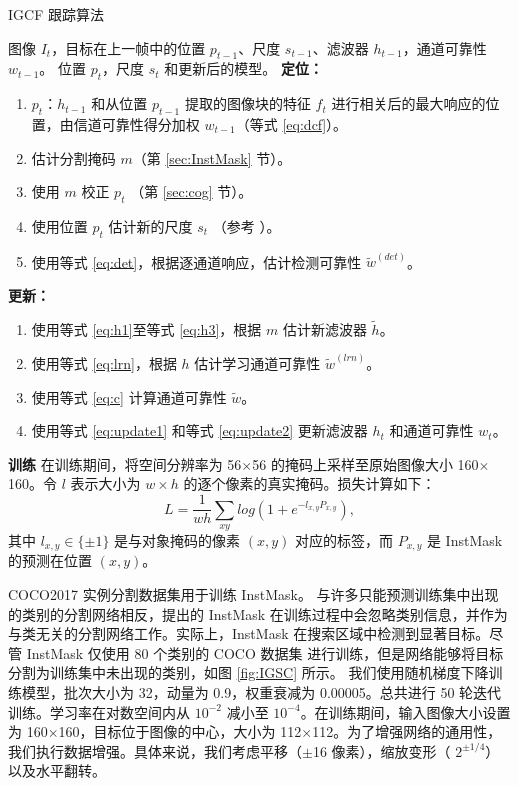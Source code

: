 \begin{algorithm}[t]
  \caption{IGCF 跟踪算法} 
  \begin{algorithmic}
    \Require 图像 $I_t$，目标在上一帧中的位置 $p_{t-1}$、尺度 $s_{t-1}$、滤波器 $h_{t-1}$，通道可靠性 $w_{t-1}$。
    \Ensure 位置 $p_t$，尺度 $s_t$ 和更新后的模型。
  \Statex
  \State \textbf{定位：}
  \begin{enumerate}[leftmargin=0pt,itemindent=1.5em]
    \item $p_t$：$h_{t-1}$ 和从位置 $p_{t-1}$ 提取的图像块的特征 $f_{t}$ 进行相关后的最大响应的位置，由信道可靠性得分加权 $w_{t-1}$（等式 \ref{eq:dcf}）。
    \item 估计分割掩码 $m$（第 \ref{sec:InstMask} 节）。
    \item 使用 $m$ 校正 $p_t$ （第 \ref{sec:cog} 节）。
    \item 使用位置 $p_t$ 估计新的尺度 $s_ t$ （参考 \cite{Danelljan2014AccurateSE}）。
    \item 使用等式 \ref{eq:det}，根据逐通道响应，估计检测可靠性 $\tilde{w}^{(det)}$。
  \end{enumerate}
  \State \textbf{更新：}
  \begin{enumerate}[leftmargin=0pt,itemindent=1.5em]
    \item 使用等式 \ref{eq:h1}至等式 \ref{eq:h3}，根据 $m$ 估计新滤波器 $\tilde{h}$。
    \item 使用等式 \ref{eq:lrn}，根据 $h$ 估计学习通道可靠性 $\tilde{w}^{(lrn)}$。
    \item 使用等式 \ref{eq:c} 计算通道可靠性 $\tilde{w}$。
    \item 使用等式 \ref{eq:update1} 和等式 \ref{eq:update2} 更新滤波器 $h_t$ 和通道可靠性 $w_t$。
  \end{enumerate}
\end{algorithmic}
\end{algorithm}

\textbf{训练} 在训练期间，将空间分辨率为 56$\times$56 的掩码上采样至原始图像大小 160$\times$160。令 $l$ 表示大小为 $w \times h$ 的逐个像素的真实掩码。损失计算如下：
\begin{equation}
L = \frac{1}{wh} \sum_{xy}{log(1+e^{-l_{x,y}P_{x,y}})},
\end{equation}
其中 $l_{x,y} \in \{ \pm 1 \}$ 是与对象掩码的像素 $(x,y)$ 对应的标签，而 $P_{x,y}$ 是 InstMask 的预测在位置 $(x,y)$。

COCO2017 \cite{COCO} 实例分割数据集用于训练 InstMask。
与许多只能预测训练集中出现的类别的分割网络相反，提出的 InstMask 在训练过程中会忽略类别信息，并作为与类无关的分割网络工作。实际上，InstMask 在搜索区域中检测到显著目标。尽管 InstMask 仅使用 80 个类别的 COCO 数据集 \cite{COCO} 进行训练，但是网络能够将目标分割为训练集中未出现的类别，如图 \ref{fig:IGSC} 所示。
我们使用随机梯度下降训练模型，批次大小为 32，动量为 0.9，权重衰减为 0.00005。总共进行 50 轮迭代训练。学习率在对数空间内从 $10^{-2}$ 减小至 $10^{-4}$。在训练期间，输入图像大小设置为 160$\times$160，目标位于图像的中心，大小为 112$\times$112。为了增强网络的通用性，我们执行数据增强。具体来说，我们考虑平移（$\pm$16 像素），缩放变形（ $2^{\pm 1/4}$）以及水平翻转。

